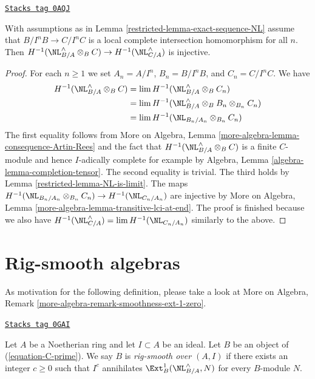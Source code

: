\begin{lemma}
\label{restricted-lemma-transitive-lci-at-end}
\href{https://stacks.math.columbia.edu/tag/0AQJ}{\texttt{Stacks tag 0AQJ}}

With assumptions as in Lemma \ref{restricted-lemma-exact-sequence-NL}
assume that $B/I^nB \to C/I^nC$ is a local complete intersection
homomorphism for all $n$. Then
$H^{-1}(\NL_{B/A}^\wedge \otimes_B C) \to H^{-1}(\NL_{C/A}^\wedge)$
is injective.
\end{lemma}

\begin{proof}

For each $n \geq 1$ we set $A_n = A/I^n$, $B_n = B/I^nB$, and
$C_n = C/I^nC$. We have
\begin{align*}
H^{-1}(\NL_{B/A}^\wedge \otimes_B C)
& =
\lim H^{-1}(\NL_{B/A}^\wedge \otimes_B C_n) \\
& =
\lim H^{-1}(\NL_{B/A}^\wedge \otimes_B B_n \otimes_{B_n} C_n) \\
& =
\lim H^{-1}(\NL_{B_n/A_n} \otimes_{B_n} C_n)
\end{align*}
The first equality follows from
More on Algebra, Lemma \ref{more-algebra-lemma-consequence-Artin-Rees}
and the fact that $H^{-1}(\NL_{B/A}^\wedge \otimes_B C)$ is a finite
$C$-module and hence $I$-adically complete for example by
Algebra, Lemma \ref{algebra-lemma-completion-tensor}.
The second equality is trivial.
The third holds by Lemma \ref{restricted-lemma-NL-is-limit}.
The maps $H^{-1}(\NL_{B_n/A_n} \otimes_{B_n} C_n) \to
H^{-1}(\NL_{C_n/A_n})$ are injective by
More on Algebra, Lemma \ref{more-algebra-lemma-transitive-lci-at-end}.
The proof is finished because we also have
$H^{-1}(\NL_{C/A}^\wedge) = \lim H^{-1}(\NL_{C_n/A_n})$
similarly to the above.
\end{proof}

\section{Rig-smooth algebras}
\label{restricted-section-rig-smooth}
As motivation for the following definition, please take a look at
More on Algebra, Remark \ref{more-algebra-remark-smoothness-ext-1-zero}.

\begin{definition}
\label{restricted-definition-rig-smooth-homomorphism}
\href{https://stacks.math.columbia.edu/tag/0GAI}{\texttt{Stacks tag 0GAI}}

Let $A$ be a Noetherian ring and let $I \subset A$ be an ideal.
Let $B$ be an object of (\ref{equation-C-prime}). We say
$B$ is {\it rig-smooth over $(A, I)$} if there exists an integer $c \geq 0$
such that $I^c$ annihilates $\Ext^1_B(\NL_{B/A}^\wedge, N)$ for every
$B$-module $N$.
\end{definition}

